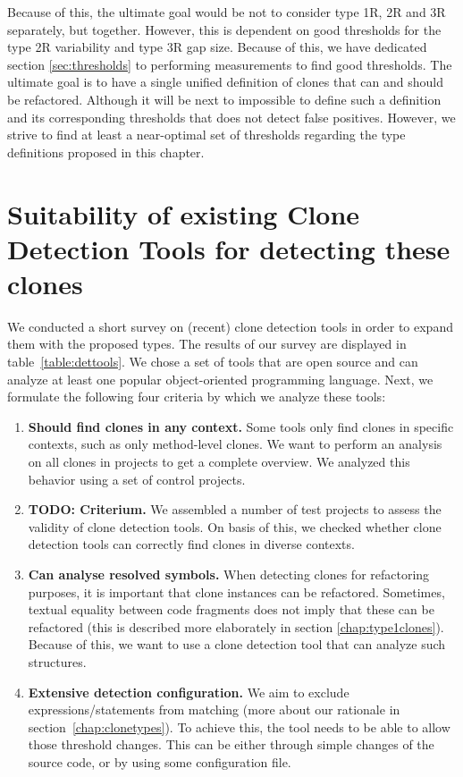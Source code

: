 Because of this, the ultimate goal would be not to consider type 1R, 2R and 3R separately, but together. However, this is dependent on good thresholds for the type 2R variability and type 3R gap size. Because of this, we have dedicated section \ref{sec:thresholds} to performing measurements to find good thresholds. The ultimate goal is to have a single unified definition of clones that can and should be refactored. Although it will be next to impossible to define such a definition and its corresponding thresholds that does not detect false positives. However, we strive to find at least a near-optimal set of thresholds regarding the type definitions proposed in this chapter.

\section{Suitability of existing Clone Detection Tools for detecting these clones}
\label{ch:tool-overview}
We conducted a short survey on (recent) clone detection tools in order to expand them with the proposed types. The results of our survey are displayed in table~\ref{table:dettools}. We chose a set of tools that are open source and can analyze at least one popular object-oriented programming language. Next, we formulate the following four criteria by which we analyze these tools:
\begin{enumerate}
    \item \textbf{Should find clones in any context.} Some tools only find clones in specific contexts, such as only method-level clones. We want to perform an analysis on all clones in projects to get a complete overview. We analyzed this behavior using a set of control projects.
\item \textbf{TODO: Criterium.} We assembled a number of test projects to assess the validity of clone detection tools. On basis of this, we checked whether clone detection tools can correctly find clones in diverse contexts.
\item \textbf{Can analyse resolved symbols.} When detecting clones for refactoring purposes, it is important that clone instances can be refactored. Sometimes, textual equality between code fragments does not imply that these can be refactored (this is described more elaborately in section \ref{chap:type1clones}). Because of this, we want to use a clone detection tool that can analyze such structures.
\item \textbf{Extensive detection configuration.} We aim to exclude expressions/statements from matching (more about our rationale in section~\ref{chap:clonetypes}). To achieve this, the tool needs to be able to allow those threshold changes. This can be either through simple changes of the source code, or by using some configuration file.
\end{enumerate}

